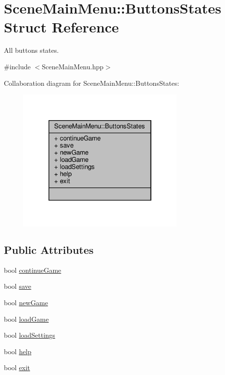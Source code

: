\hypertarget{struct_scene_main_menu_1_1_buttons_states}{}\section{Scene\+Main\+Menu\+:\+:Buttons\+States Struct Reference}
\label{struct_scene_main_menu_1_1_buttons_states}


All buttons states.  




{\ttfamily \#include $<$Scene\+Main\+Menu.\+hpp$>$}



Collaboration diagram for Scene\+Main\+Menu\+:\+:Buttons\+States\+:
\nopagebreak
\begin{figure}[H]
\begin{center}
\leavevmode
\includegraphics[width=238pt]{struct_scene_main_menu_1_1_buttons_states__coll__graph}
\end{center}
\end{figure}
\subsection*{Public Attributes}
\begin{DoxyCompactItemize}
\item 
bool \hyperlink{struct_scene_main_menu_1_1_buttons_states_a134d9fa7b44590be628cfd76661d0328}{continue\+Game}
\item 
bool \hyperlink{struct_scene_main_menu_1_1_buttons_states_aeb015a3f6ff49aa321e9ed50291a0897}{save}
\item 
bool \hyperlink{struct_scene_main_menu_1_1_buttons_states_a266bd47715dbc95ee9b7325327ae1981}{new\+Game}
\item 
bool \hyperlink{struct_scene_main_menu_1_1_buttons_states_a7cce9e898d97a704bd4e4e9e0e243c8c}{load\+Game}
\item 
bool \hyperlink{struct_scene_main_menu_1_1_buttons_states_afcdb7f4b98f2b0166775503a5c69dd8e}{load\+Settings}
\item 
bool \hyperlink{struct_scene_main_menu_1_1_buttons_states_ac927874c333c653cea1458bce713c323}{help}
\item 
bool \hyperlink{struct_scene_main_menu_1_1_buttons_states_ab6cce0f83b5ceb8eee57f57c83e5c744}{exit}
\end{DoxyCompactItemize}


